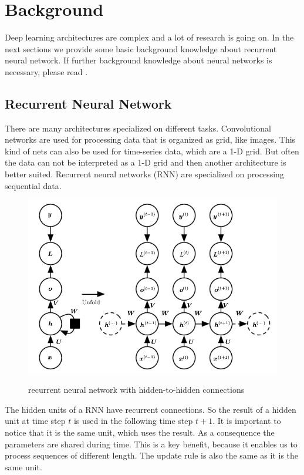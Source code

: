 \section{Background}
\label{sec:background}
Deep learning architectures are complex and a lot of research is going on. In the next sections we provide some basic background knowledge about recurrent neural network. If further background knowledge about neural networks is necessary, please read \cite{DeepLearning}.

\subsection{Recurrent Neural Network}
\label{sec:rnn}
There are many architectures specialized on different tasks. Convolutional networks are used for processing data that is organized as grid, like images. This kind of nets can also be used for time-series data, which are a 1-D grid. But often the data can not be interpreted as a 1-D grid and then another architecture is better suited. Recurrent neural networks (RNN) are specialized on processing sequential data.\\
\begin{figure}[thb]
	\caption{recurrent neural network with hidden-to-hidden connections \cite[p. 373]{DeepLearning}}
	\includegraphics[width=0.95\linewidth]{images/rnn.PNG}
	\label{fig:rnn}
\end{figure}
The hidden units of a RNN have recurrent connections. So the result of a hidden unit at time step $t$ is used in the following time step $t+1$. It is important to notice that it is the same unit, which uses the result. As a consequence the parameters are shared during time. This is a key benefit, because it enables us to process sequences of different length. The update rule is also the same as it is the same unit.\\

